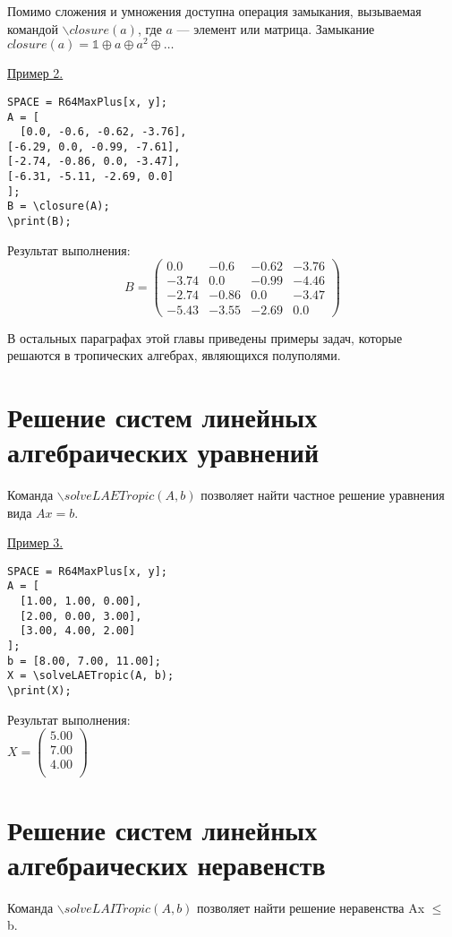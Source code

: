 Помимо сложения и умножения доступна операция замыкания, вызываемая командой $\backslash closure(a)$, где $a$ --- элемент или матрица.
Замыкание $closure(a)=\mathbb{1}\oplus a\oplus a^{2}\oplus\dots$
\smallskip

\underline{Пример 2. }

\vspace*{-3mm}
\begin{verbatim}
SPACE = R64MaxPlus[x, y];
A = [
  [0.0, -0.6, -0.62, -3.76],
[-6.29, 0.0, -0.99, -7.61],
[-2.74, -0.86, 0.0, -3.47],
[-6.31, -5.11, -2.69, 0.0]
];
B = \closure(A);
\print(B); 
\end{verbatim}

Результат выполнения:\\
$$B=
 \left(\begin{array}{cccc}
0.0 & -0.6 & -0.62 & -3.76\\
-3.74 & 0.0 & -0.99 & -4.46\\
-2.74 & -0.86 & 0.0 & -3.47\\
-5.43 & -3.55 & -2.69 & 0.0
\end{array}\right)$$

В остальных параграфах этой главы приведены примеры задач, которые решаются в тропических алгебрах, являющихся полуполями.
\section{Решение систем линейных алгебраических уравнений}
Команда $\backslash solveLAETropic(A, b)$ позволяет найти частное решение уравнения вида $Ax = b$.
\smallskip

\underline{Пример 3. }

\vspace*{-3mm}
\begin{verbatim}
SPACE = R64MaxPlus[x, y];
A = [
  [1.00, 1.00, 0.00],
  [2.00, 0.00, 3.00],
  [3.00, 4.00, 2.00]
];
b = [8.00, 7.00, 11.00];
X = \solveLAETropic(A, b); 
\print(X);
\end{verbatim}

Результат выполнения:\\
$X = \left(\begin{array}{c}
5.00\\
7.00\\
4.00\\
\end{array}\right)
$ 
\section{Решение систем линейных алгебраических неравенств}
Команда $\backslash solveLAITropic(A,b)$ позволяет найти решение неравенства Ax $\leq$ b.

